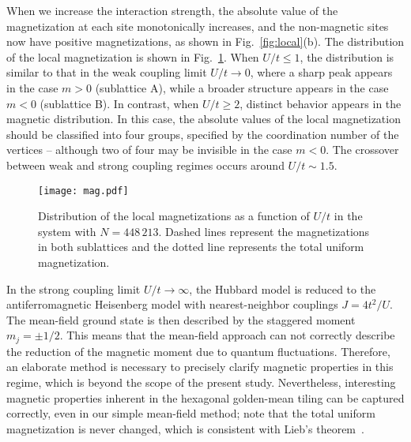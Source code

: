 \documentclass[aps,twocolumn,pra,superscriptaddress,amsmath,amssymb]{revtex4-1}
\begin{document}
When we increase the interaction strength, the absolute value of
the magnetization at each site monotonically increases,
and the non-magnetic sites now have positive magnetizations,
as shown in Fig.~\ref{fig:local}(b).
The distribution of the local magnetization is shown in Fig.~\ref{mag}.
When $U/t\le 1$, the distribution is similar to that in the weak coupling limit $U/t\rightarrow 0$,
where a sharp peak appears in the case $m>0$ (sublattice A),
while a broader structure appears in the case $m<0$ (sublattice B).
In contrast, when $U/t\ge 2$,
distinct behavior appears in the magnetic distribution.
In this case, the absolute values of the local magnetization
should be classified into four groups,
specified by the coordination number of the vertices --
although two of four may be invisible in the case $m<0$.
The crossover between weak and strong coupling regimes occurs
around $U/t\sim 1.5$.
\begin{figure}[htb]
 \texttt{[image: mag.pdf]}
 \caption{
   Distribution of the local magnetizations 
   as a function of $U/t$ in the system with $N=448\,213$.
   Dashed lines represent the magnetizations in both sublattices
   and the dotted line represents the total uniform magnetization.
 }
 \label{mag}
\end{figure}
In the strong coupling limit $U/t\rightarrow \infty$,
the Hubbard model is reduced to
the antiferromagnetic Heisenberg model with nearest-neighbor couplings $J=4t^2/U$.
The mean-field ground state is then described by the staggered moment $m_j=\pm 1/2$.
This means that the mean-field approach can not 
correctly describe the reduction of the magnetic moment due to quantum fluctuations.
Therefore, an elaborate method is necessary to precisely clarify magnetic properties in this regime, which is beyond the scope of the present study.
Nevertheless, interesting magnetic properties inherent in the hexagonal golden-mean tiling
can be captured correctly, even in our simple mean-field method;
note that the total uniform magnetization is never changed,
which is consistent with Lieb's theorem~\cite{Lieb}.
\end{document}
